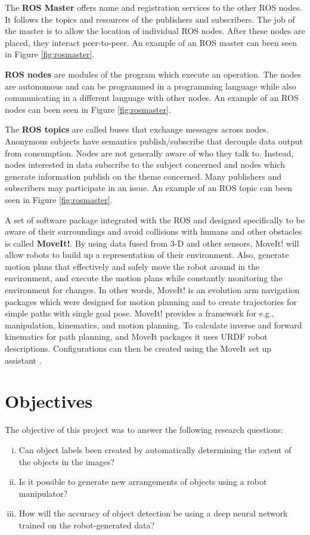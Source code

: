 The \textbf{ROS Master} offers name and registration services to the other ROS nodes. It follows the topics and resources of the publishers and subscribers. The job of the master is to allow the location of individual ROS nodes. After these nodes are placed, they interact peer-to-peer\cite{noauthor_master_nodate}. An example of an ROS master can been seen in Figure \ref{fig:rosmaster}.


\textbf{ROS nodes} are modules of the program which execute an operation. 
The nodes are autonomous and can be programmed in a programming language while also communicating in a different language with other nodes\cite{noauthor_rostutorialsunderstandingnodes_nodate}. An example of an ROS nodes can been seen in Figure \ref{fig:rosmaster}.


The \textbf{ROS topics} are called buses that exchange messages across nodes. Anonymous subjects have semantics publish/subscribe that decouple data output from consumption. Nodes are not generally aware of who they talk to. Instead, nodes interested in data subscribe to the subject concerned and nodes which generate information publish on the theme concerned. Many publishers and subscribers may participate in an issue\cite{noauthor_topics_nodate}. An example of an ROS topic can been seen in Figure \ref{fig:rosmaster}.

A set of software package integrated with the ROS and designed specifically to be aware of their surroundings and avoid collisions with humans and other obstacles is called \textbf{MoveIt!}. By using data fused from 3-D and other sensors, MoveIt! will allow robots to build up a representation of their environment. Also, generate motion plans that effectively and safely move the robot around in the environment, and execute the motion plans while constantly monitoring the environment for changes. In other words, MoveIt! is an evolution arm navigation packages which were designed for motion planning and to create trajectories for simple paths with single goal pose. MoveIt! provides a framework for e.g., manipulation, kinematics, and motion planning. To calculate inverse and forward kinematics for path planning, and MoveIt packages it uses URDF robot descriptions. Configurations can then be created using the MoveIt set up assistant \cite{chitta_moveitros_2012}.

\section{Objectives}
The objective of this project was to answer the following research questions:
\begin{enumerate}[i.]
    \item Can object labels been created by automatically determining the extent of the objects in the images?
    \item Is it possible to generate new arrangements of objects using a robot manipulator?
    \item How will the accuracy of object detection be using a deep neural network trained on the robot-generated data?
\end{enumerate}